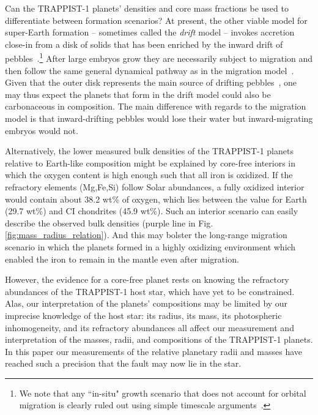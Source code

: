 \documentclass[twocolumn]{aastex63}
\begin{document}
Can the TRAPPIST-1 planets' densities and core mass fractions be used to differentiate between formation scenarios? At present, the other viable model for super-Earth formation -- sometimes called the {\em drift} model -- invokes accretion close-in from a disk of solids that has been enriched by the inward drift of pebbles~\citep{chatterjee14,chatterjee15,dawson15}.\footnote{We note that any ``in-situ" growth scenario that does not account for orbital migration is clearly ruled out using simple timescale arguments~\citep[i.e., because migration -- and even aerodynamic drift -- is far too fast to ignore; see][]{ogihara15,inamdar15,izidoro2018}.} After large embryos grow they are necessarily subject to migration and then follow the same general dynamical pathway as in the migration model~\citep[involving resonant capture and later breaking of resonant chains; see discussion in][]{raymond18d}. Given that the outer disk represents the main source of drifting pebbles~\citep{lambrechts14,ida16}, one may thus expect the planets that form in the drift model could also be carbonaceous in composition. The main difference with regards to the migration model is that inward-drifting pebbles would lose their water but inward-migrating embryos would not. %

Alternatively, the lower measured bulk densities of the TRAPPIST-1 planets relative to Earth-like composition might be explained by core-free interiors \citep{ElkinsTanton2008} in which the oxygen content is high enough such that all iron is oxidized. If the refractory elements (Mg,Fe,Si) follow Solar abundances, a fully oxidized interior would contain about 38.2 wt\% of oxygen, which lies between the value for Earth (29.7 wt\%) and CI chondrites (45.9 wt\%). Such an interior scenario can easily describe the observed bulk densities (purple line in Fig. \ref{fig:mass_radius_relation}).  And this may bolster the long-range migration scenario in which the planets formed in a highly oxidizing environment which enabled the iron to remain in the mantle even after migration.

However, the evidence for a core-free planet rests on knowing the refractory abundances of the TRAPPIST-1 host star, which have yet to be constrained.  Alas, our interpretation of the planets' compositions may be limited by our imprecise knowledge of the host star:  its radius, its mass, its photospheric inhomogeneity, and its refractory abundances all affect our measurement and interpretation of the masses, radii, and compositions of the TRAPPIST-1 planets.  In this paper our measurements of the relative planetary radii and masses have reached such a precision that the fault may now lie in the star.
\end{document}
